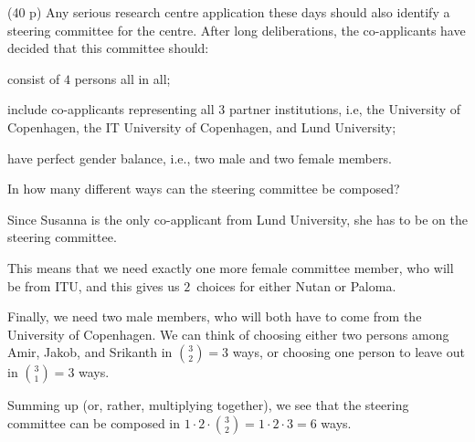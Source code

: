 \documentclass{jn-pset}
\begin{document}
\begin{problem}
  \begin{subproblem}
    {(40 p)}
    {\ignorespaces}
    Any serious research centre application these days should also
    identify a steering committee for the centre.
    After long deliberations, the co-applicants have decided that this
    committee should:
    \begin{compactitem}
    \item
      consist of $4$ persons all in all;

    \item
      include co-applicants representing all $3$ partner
      institutions, i.e, 
      the University of Copenhagen,
      the IT University of Copenhagen,
      and
      Lund University;

    \item
      have perfect gender balance, i.e., two male and two female members.
      
    \end{compactitem}
    In how many different ways can the steering committee be composed?
    
  \end{subproblem}

\begin{solution}
  Since Susanna is the only co-applicant from Lund University, she has
  to be on the steering committee.

  This means that we need exactly one more female committee member,
  who will be from ITU,
  and this gives us $2$~choices for either Nutan or Paloma.

  Finally, we need two male members, who will both have to come from
  the University of Copenhagen.
  We can  think of choosing either two persons among Amir, Jakob, and
  Srikanth in
  $\binom{3}{2} = 3$ ways,
  or choosing one person to leave out in
  $\binom{3}{1} = 3$ ways.

  Summing up (or, rather, multiplying together), we see that the
  steering committee can be composed in
  $
  1 \cdot 2 \cdot \binom{3}{2}
  =
  1 \cdot 2  \cdot 3 = 6
  $
  ways.  
\end{solution}
  
  
\end{problem}


\end{document}
